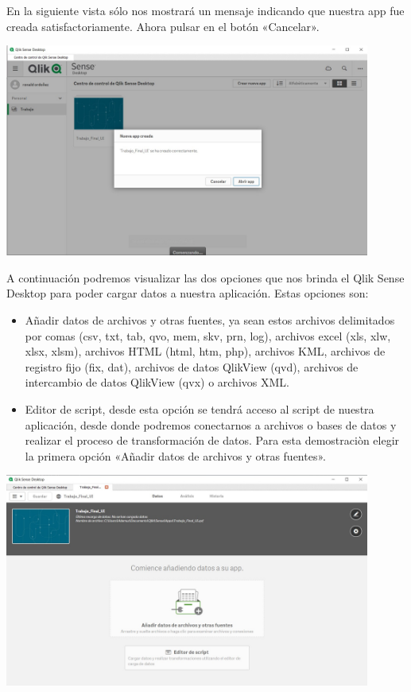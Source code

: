 En la siguiente vista sólo nos mostrará un mensaje indicando que nuestra app fue creada satisfactoriamente. Ahora pulsar en el botón «Cancelar».
\begin{center}
	\includegraphics[width=12cm]{./Imagenes/img10} 
\end{center}

A continuación podremos visualizar las dos opciones que nos brinda el Qlik Sense Desktop para poder cargar datos a nuestra aplicación. Estas opciones son:

\begin{itemize}
		\item Añadir datos de archivos y otras fuentes, ya sean estos archivos delimitados por comas (csv, txt, tab, qvo, mem, skv, prn, log), archivos excel (xls, xlw, xlsx, xlsm), archivos HTML (html, htm, php), archivos KML, archivos de registro fijo (fix, dat), archivos de datos QlikView (qvd), archivos de intercambio de datos QlikView (qvx) o archivos XML.
		\item Editor de script, desde esta opción se tendrá acceso al script de nuestra aplicación, desde donde podremos conectarnos a archivos o bases de datos y realizar el proceso de transformación de datos.
Para esta demostraciòn elegir la primera opción «Añadir datos de archivos y otras fuentes».
\end{itemize}


\begin{center}
	\includegraphics[width=12cm]{./Imagenes/img11} 
\end{center}


